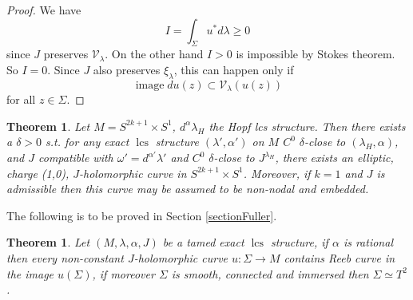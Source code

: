 \documentclass{amsart}
\numberwithin{equation}{section}
\newtheorem{theorem}[equation]{Theorem}
\newtheorem{conjecture}{Conjecture}
\theoremstyle{definition}
\theoremstyle{remark}
\newtheorem{remark}[equation]{Remark}
\DeclareMathOperator{\image}{\mathrm{image}}
\DeclareMathOperator{\lcs}{lcs}
\begin{document}
\begin{proof} We have $$I=\int _{\Sigma} u ^{*} d \lambda \geq 0 $$ since $J$ preserves $\mathcal{V} _{\lambda} $. On the other hand $I > 0 $ is impossible by Stokes theorem. So $I=0$. Since $J$ also preserves $\xi _{\lambda} $, this can happen only if $$\image du (z) \subset \mathcal{V} _{\lambda} (u (z)) $$ for all $z \in \Sigma$. 
\end{proof}
\begin{theorem} \label{thm:holomorphicSeifert} Let $M=S ^{2k+1}  \times S ^{1}$, $d ^{\alpha} \lambda _{H} $ the Hopf lcs structure. Then there exists a $\delta>0$ s.t. for any exact $\lcs$ structure $(\lambda', \alpha' )$ on $M$ $C ^{0} $ $\delta$-close to $(\lambda _{H}, \alpha)$, and $J$ compatible with $\omega'=d ^{\alpha'} \lambda' $ and $C ^{0} $ $\delta$-close to $J ^{\lambda _{H} } $, there exists an elliptic, charge (1,0), $J$-holomorphic curve in $S ^{2k+1}  \times S ^{1} $. Moreover, if $k=1$ and $J$ is admissible then this curve may be assumed to be non-nodal and embedded.
\end{theorem}
The following is to be proved in Section \ref{sectionFuller}.
\begin{theorem} \label{lemma:Reeb}
Let $(M,\lambda, \alpha, J)$ be a tamed exact $\lcs$ structure, if $\alpha$ is rational then every non-constant $J$-holomorphic curve $u: \Sigma \to M$ contains Reeb curve in the image $u (\Sigma)$,  
if moreover $\Sigma$ is smooth, connected and immersed then $\Sigma \simeq T ^{2} $.
\end{theorem}
\end{document}
